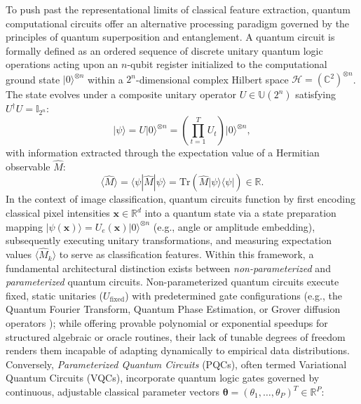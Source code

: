 \documentclass[pdflatex,sn-mathphys-num]{sn-jnl}%
\theoremstyle{thmstyleone}%
\theoremstyle{thmstyletwo}%
\theoremstyle{thmstylethree}%
\begin{document}
To push past the representational limits of classical feature extraction, quantum computational circuits offer an alternative processing paradigm governed by the principles of quantum superposition and entanglement. A quantum circuit is formally defined as an ordered sequence of discrete unitary quantum logic operations acting upon an $n$-qubit register initialized to the computational ground state $|0\rangle^{\otimes n}$ within a $2^n$-dimensional complex Hilbert space $\mathcal{H} = (\mathbb{C}^2)^{\otimes n}$. The state evolves under a composite unitary operator $U \in \mathbb{U}(2^n)$ satisfying $U^\dagger U = \mathbb{I}_{2^n}$:
\begin{equation}
|\psi\rangle = U |0\rangle^{\otimes n} = \left(\prod_{t=1}^T U_t\right) |0\rangle^{\otimes n},
\label{eq:quantum_circuit_evolution}
\end{equation}
with information extracted through the expectation value of a Hermitian observable $\hat{M}$:
\begin{equation}
\langle \hat{M} \rangle = \langle \psi | \hat{M} | \psi \rangle = \mathrm{Tr}\left(\hat{M} |\psi\rangle\langle\psi|\right) \in \mathbb{R}.
\label{eq:expectation_readout}
\end{equation}
In the context of image classification, quantum circuits function by first encoding classical pixel intensities $\mathbf{x} \in \mathbb{R}^d$ into a quantum state via a state preparation mapping $|\psi(\mathbf{x})\rangle = U_e(\mathbf{x}) |0\rangle^{\otimes n}$ (e.g., angle or amplitude embedding), subsequently executing unitary transformations, and measuring expectation values $\langle \hat{M}_k \rangle$ to serve as classification features. Within this framework, a fundamental architectural distinction exists between \textit{non-parameterized} and \textit{parameterized} quantum circuits. Non-parameterized quantum circuits execute fixed, static unitaries ($U_{\mathrm{fixed}}$) with predetermined gate configurations (e.g., the Quantum Fourier Transform, Quantum Phase Estimation, or Grover diffusion operators \cite{nielsen2010quantum}); while offering provable polynomial or exponential speedups for structured algebraic or oracle routines, their lack of tunable degrees of freedom renders them incapable of adapting dynamically to empirical data distributions. Conversely, \textit{Parameterized Quantum Circuits} (PQCs), often termed Variational Quantum Circuits (VQCs), incorporate quantum logic gates governed by continuous, adjustable classical parameter vectors $\boldsymbol{\theta} = (\theta_1, \dots, \theta_P)^T \in \mathbb{R}^P$:
\end{document}
